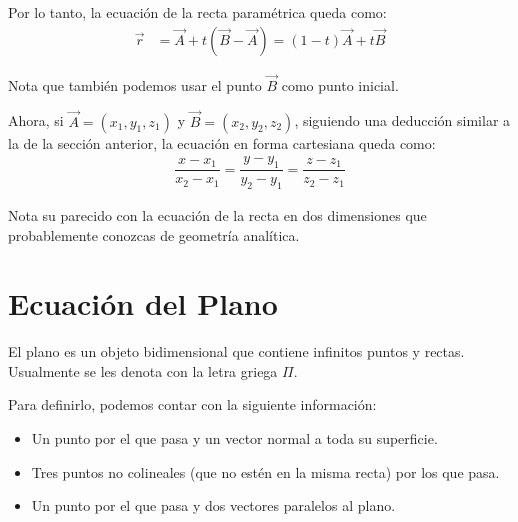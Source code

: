 \documentclass[12pt, fleqn]{report}                             %
\theoremstyle{break}                                            %
\newcommand{\Wrap}[1]{\left( #1 \right)}                        %
\begin{document}
                Por lo tanto, la ecuación de la recta paramétrica queda como:
                \begin{align}
                    \vec{r} &= \vec{A} + t\Wrap{\vec{B} - \vec{A}} = (1 - t)\vec{A} + t\vec{B}
                    \label{lineEquation2}
                \end{align}
                
                Nota que también podemos usar el punto $\vec{B}$ como punto inicial.
                
                Ahora, si $\vec{A} = (x_1, y_1, z_1)$ y $\vec{B} = (x_2, y_2, z_2)$, siguiendo
                una deducción similar a la de la sección anterior, la ecuación en forma cartesiana
                queda como:
                \begin{align}
                      \dfrac{x - x_1}{x_2 - x_1}
                    = \dfrac{y - y_1}{y_2 - y_1}
                    = \dfrac{z - z_1}{z_2 - z_1}
                    \label{lineEquation3}
                \end{align}
                
                Nota su parecido con la ecuación de la recta en dos dimensiones que probablemente
                conozcas de geometría analítica.



        \clearpage
        \section{Ecuación del Plano}
        
            El plano es un objeto bidimensional que contiene infinitos puntos y rectas.
            Usualmente se les denota con la letra griega $\Pi$.

            Para definirlo, podemos contar con la siguiente información:
            \begin{itemize}
                \item Un punto por el que pasa y un vector normal a toda su superficie.
                \item Tres puntos no colineales (que no estén en la misma recta) por los que pasa.
                \item Un punto por el que pasa y dos vectores paralelos al plano.
            \end{itemize}
        
\end{document}
